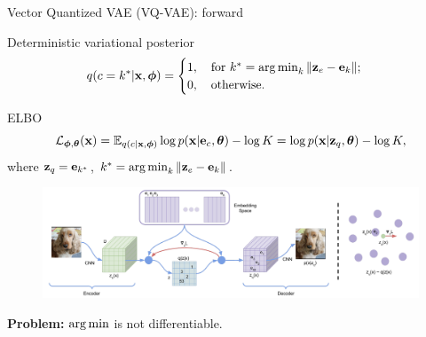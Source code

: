\begin{frame}{Vector Quantized VAE (VQ-VAE): forward}
	\begin{block}{Deterministic variational posterior}
		\vspace{-0.3cm}
		\[
			q(c = k^* | \mathbf{x}, \boldsymbol{\phi}) = \begin{cases}
				1 , \quad \text{for } k^* = \operatorname*{arg\,min}_k \| \mathbf{z}_e - \mathbf{e}_k \|; \\
				0, \quad \text{otherwise}.
		\end{cases}
		\]
	\vspace{-0.5cm}
	\end{block}	
	\begin{block}{ELBO}
		\vspace{-0.6cm}
		\[
		\mathcal{L}_{\boldsymbol{\phi}, \boldsymbol{\theta}}(\mathbf{x})  = \mathbb{E}_{q(c | \mathbf{x}, \boldsymbol{\phi})} \log p(\mathbf{x} | \mathbf{e}_{c} , \boldsymbol{\theta}) - \log K =  \log p(\mathbf{x} | \mathbf{z}_q, \boldsymbol{\theta}) - \log K,
		\]
		where $\mathbf{z}_q = \mathbf{e}_{k^*}$, $k^* = \operatorname*{arg\,min}_k \| \mathbf{z}_e - \mathbf{e}_k \|$.
	\end{block}
	\vspace{-0.3cm} 
	\begin{figure}
		\centering
		\includegraphics[width=0.85\linewidth]{figs/vqvae}
	\end{figure}
	\vspace{-0.3cm} 
	\textbf{Problem:} $\operatorname*{arg\,min}$ is not differentiable.
\end{frame}
